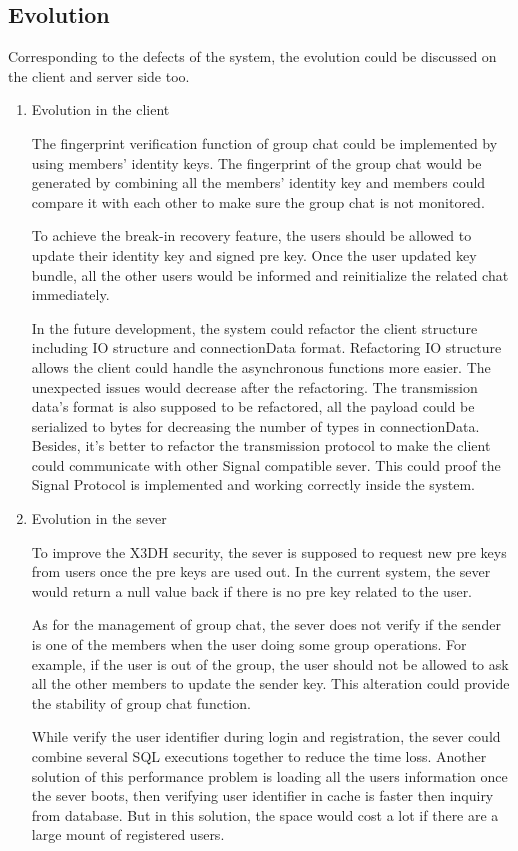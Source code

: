 \subsection{Evolution}
Corresponding to the defects of the system, the evolution could be discussed on the client and server side too.

\begin{enumerate}[label=(\roman*)]
\item Evolution in the client

The fingerprint verification function of group chat could be implemented by using members' identity keys. The fingerprint of the group chat would be generated by combining all the members' identity key and members could compare it with each other to make sure the group chat is not monitored.

To achieve the break-in recovery feature, the users should be allowed to update their identity key and signed pre key. Once the user updated key bundle, all the other users would be informed and reinitialize the related chat immediately.

In the future development, the system could refactor the client structure including IO structure and connectionData format. Refactoring IO structure allows the client could handle the asynchronous functions more easier. The unexpected issues would decrease after the refactoring. The transmission data's format is also supposed to be refactored, all the payload could be serialized to bytes for decreasing the number of types in connectionData. Besides, it's better to refactor the transmission protocol to make the client could communicate with other Signal compatible sever. This could proof the Signal Protocol is implemented and working correctly inside the system.

\item Evolution in the sever

To improve the X3DH security, the sever is supposed to request new pre keys from users once the pre keys are used out. In the current system, the sever would return a null value back if there is no pre key related to the user.

As for the management of group chat, the sever does not verify if the sender is one of the members when the user doing some group operations. For example, if the user is out of the group, the user should not be allowed to ask all the other members to update the sender key. This alteration could provide the stability of group chat function.

While verify the user identifier during login and registration, the sever could combine several SQL executions together to reduce the time loss. Another solution of this performance problem is loading all the users information once the sever boots, then verifying user identifier in cache is faster then inquiry from database. But in this solution, the space would cost a lot if there are a large mount of registered users.

\end{enumerate}

\clearpage